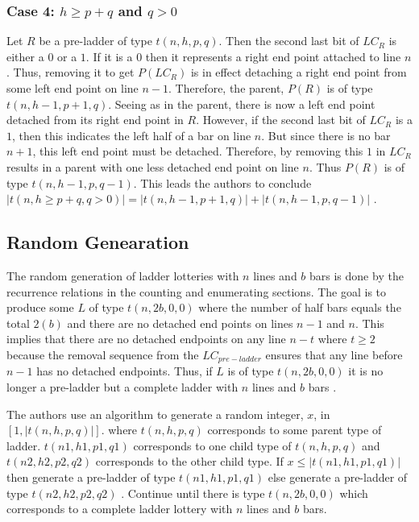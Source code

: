 \subsubsection{Case 4: $h\geq p+q$ and $q>0$}
Let $R$ be a pre-ladder of type $t(n,h,p,q)$. Then 
the second last bit of $LC_{R}$ is either a $0$ 
or a $1$. If it is a $0$ then it represents a 
right end point attached to line $n$. Thus, 
removing it to get $P(LC_{R})$ is in effect 
detaching a right end point from some left end point 
on line $n-1$. Therefore, the parent, $P(R)$ is 
of type $t(n,h-1,p+1,q)$. Seeing as in the parent, 
there is now a left end point detached from its right 
end point in $R$. However, if the second last bit 
of $LC_{R}$ is a $1$, then this indicates the left 
half of a bar on line $n$. But since there is no 
bar $n+1$, this left end point must be detached. 
Therefore, by removing this $1$ in $LC_{R}$ results 
in a parent with one less detached end point on line $n$.
Thus $P(R)$ is of type $t(n,h-1,p,q-1)$. This leads the 
authors to conclude $|t(n,h\geq p+q,q>0)|=|t(n,h-1,p+1,q)|+|t(n,h-1,p,q-1)|$ \cite{A6}.
\subsection{Random Genearation}
The random generation of ladder lotteries with $n$ lines and
$b$ bars is done by the recurrence relations in the counting 
and enumerating sections. The goal is to produce 
some $L$ of type $t(n,2b,0,0)$ where the number of half 
bars equals the total $2(b)$ and there are no detached 
end points on lines $n-1$ and $n$. This implies that there 
are no detached endpoints on any line $n-t$ where $t\geq2$
because the removal sequence from the $LC_{pre-ladder}$
ensures that any line before $n-1$ has no detached endpoints. Thus, 
if $L$ is of type $t(n,2b,0,0)$ it is no longer a pre-ladder 
but a complete ladder with $n$ lines and $b$ bars \cite{A6}.\par 
The authors use an algorithm to generate a random integer, $x$,
in $[1,|t(n,h,p,q)|]$. where $t(n,h,p,q)$ corresponds to some 
parent type of ladder. $t(n1,h1,p1,q1)$ corresponds to one 
child type of $t(n,h,p,q)$ and $t(n2,h2,p2,q2)$ corresponds 
to the other child type. If $x\leq|t(n1,h1,p1,q1)|$ then generate 
a pre-ladder of type $t(n1,h1,p1,q1)$ else generate a pre-ladder 
of type $t(n2,h2,p2,q2)$ \cite{A6}. Continue until there is type $t(n,2b,0,0)$
which corresponds to a complete ladder lottery with $n$ lines and $b$ bars.